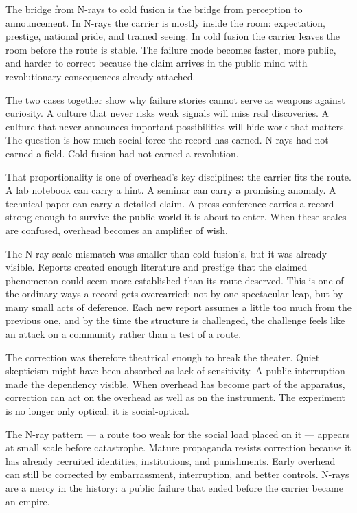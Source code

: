 The bridge from N-rays to cold fusion is the bridge from perception to
announcement. In N-rays the carrier is mostly inside the room: expectation,
prestige, national pride, and trained seeing. In cold fusion the carrier
leaves the room before the route is stable. The failure mode becomes faster,
more public, and harder to correct because the claim arrives in the public
mind with revolutionary consequences already attached.

The two cases together show why failure stories cannot serve as weapons
against curiosity. A culture that never risks weak signals will miss real
discoveries. A culture that never announces important possibilities will
hide work that matters. The question is how much social force the record has
earned. N-rays had not earned a field. Cold fusion had not earned a
revolution.

That proportionality is one of overhead's key disciplines: the carrier fits
the route. A lab notebook can carry a hint. A seminar can carry a promising
anomaly. A technical paper can carry a detailed claim. A press conference
carries a record strong enough to survive the public world it is about to
enter. When these scales are confused, overhead becomes an amplifier of
wish.

The N-ray scale mismatch was smaller than cold fusion's, but it was already
visible. Reports created enough literature and prestige that the claimed
phenomenon could seem more established than its route deserved. This is one
of the ordinary ways a record gets overcarried: not by one spectacular leap,
but by many small acts of deference. Each new report assumes a little too
much from the previous one, and by the time the structure is challenged,
the challenge feels like an attack on a community rather than a test of a
route.

The correction was therefore theatrical enough to break the theater. Quiet
skepticism might have been absorbed as lack of sensitivity. A public
interruption made the dependency visible. When overhead has become part of
the apparatus, correction can act on the overhead as well as on the
instrument. The experiment is no longer only optical; it is
social-optical.

The N-ray pattern --- a route too weak for the social load placed on it ---
appears at small scale before catastrophe. Mature propaganda resists
correction because it has already recruited identities, institutions, and
punishments. Early overhead can still be corrected by embarrassment,
interruption, and better controls. N-rays are a mercy in the history: a
public failure that ended before the carrier became an empire.


